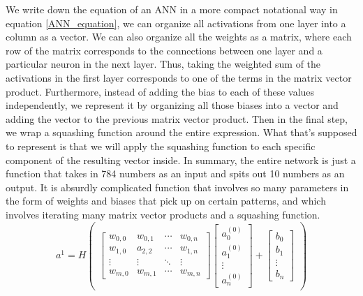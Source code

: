 \documentclass[master]{thesis-uestc}
\begin{document}
We write down the equation of an ANN in a more compact notational way in equation \ref{ANN_equation}, we can organize all activations from one layer into a column as a vector. We can also organize all the weights as a matrix, where each row of the matrix corresponds to the connections between one layer and a particular neuron in the next layer. Thus, taking the weighted sum of the activations in the first layer corresponds to one of the terms in the matrix vector product. Furthermore, instead of adding the bias to each of these values independently, we represent it by organizing all those biases into a vector and adding the vector to the previous matrix vector product. Then in the final step, we wrap a squashing function around the entire expression. What that's supposed to represent is that we will apply the squashing function to each specific component of the resulting vector inside. In summary, the entire network is just a function that takes in 784 numbers as an input and spits out 10 numbers as an output. It is absurdly complicated function that involves so many parameters in the form of weights and biases that pick up on certain patterns, and which involves iterating many matrix vector products and a squashing function.
\begin{equation}
    a^1 = 
H\begin{pmatrix}\begin{bmatrix}
  w_{0,0} & w_{0,1} & \cdots & w_{0,n} \\
  w_{1,0} & a_{2,2} & \cdots & w_{1,n} \\
  \vdots  & \vdots  & \ddots & \vdots  \\
  w_{m,0} & w_{m,1} & \cdots & w_{m,n} 
 \end{bmatrix}
 \begin{bmatrix}
  a_0^{(0)} \\
  a_1^{(0)} \\
  \vdots \\
  a_n^{(0)} 
 \end{bmatrix} + 
 \begin{bmatrix}
  b_0 \\
  b_1 \\
  \vdots \\
  b_n 
 \end{bmatrix}\end{pmatrix}
 \label{ANN_equation}
\end{equation}
\end{document}
